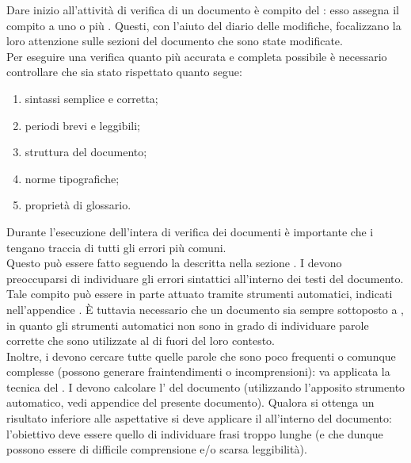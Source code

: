 					Dare inizio all'attività di verifica di un documento è compito del : esso assegna il compito a uno o più . Questi, con l'aiuto del diario delle modifiche, focalizzano la loro attenzione sulle sezioni del documento che sono state modificate.\\
Per eseguire una verifica quanto più accurata e completa possibile è necessario controllare che sia stato rispettato quanto segue:
					\begin{enumerate}
						\item sintassi semplice e corretta;
						\item periodi brevi e leggibili;
						\item struttura del documento;
						\item norme tipografiche;
						\item proprietà di glossario.
					\end{enumerate}
					Durante l'esecuzione dell'intera  di verifica dei documenti è importante che i  tengano traccia di tutti gli errori più comuni.\\ Questo può essere fatto seguendo la  descritta nella sezione .
						I  devono preoccuparsi di individuare gli errori sintattici all'interno dei testi del documento. Tale compito può essere in parte attuato tramite strumenti automatici, indicati nell'appendice . È tuttavia necessario che un documento sia sempre sottoposto a \textit{}, in quanto gli strumenti automatici non sono in grado di individuare parole corrette che sono utilizzate al di fuori del loro contesto.\\ Inoltre, i  devono cercare tutte quelle parole che sono poco frequenti o comunque complesse (possono generare fraintendimenti o incomprensioni): va applicata la tecnica del \textit{}.
						I  devono calcolare l' del documento (utilizzando l'apposito strumento automatico, vedi appendice  del presente documento). Qualora si ottenga un risultato inferiore alle aspettative si deve applicare il \textit{} all'interno del documento: l'obiettivo deve essere quello di individuare frasi troppo lunghe (e che dunque possono essere di difficile comprensione e/o scarsa leggibilità).
